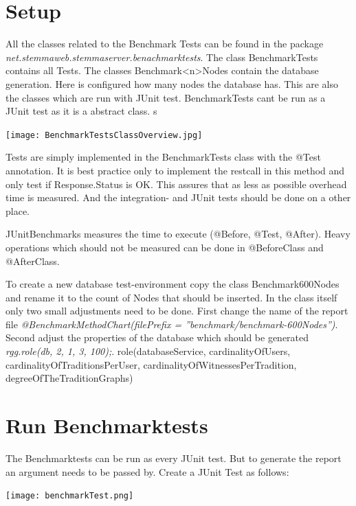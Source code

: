 \documentclass[11pt,fleqn,openany]{book} %
\begin{document}
\section*{Setup}
All the classes related to the Benchmark Tests can be found in the package \\ \textit{net.stemmaweb.stemmaserver.benachmarktests}. The class BenchmarkTests contains all Tests. The classes Benchmark<n>Nodes contain the database generation. Here is configured how many nodes the database has. This are also the classes which are run with JUnit test. BenchmarkTests cant be run as a JUnit test as it is a abstract class. s

\begin{center}
\texttt{[image: BenchmarkTestsClassOverview.jpg]} 
\end{center}

Tests are simply implemented in the BenchmarkTests class with the @Test annotation. It is best practice only to implement the restcall in this method and only test if Response.Status is OK. This assures that as less as possible overhead time is measured. And the integration- and JUnit tests should be done on a other place.

\begin{remark}
JUnitBenchmarks measures the time to execute (@Before, @Test, @After). Heavy operations which should not be measured can be done in @BeforeClass and @AfterClass.
\end{remark}

To create a new database test-environment copy the class Benchmark600Nodes and rename it to the count of Nodes that should be inserted. In the class itself only two small adjustments need to be done. First change the name of the report file \textit{@BenchmarkMethodChart(filePrefix = ''benchmark/benchmark-600Nodes'')}. Second adjust the properties of the database which should be generated \textit{rgg.role(db, 2, 1, 3, 100);}. role(databaseService, cardinalityOfUsers, cardinalityOfTraditionsPerUser, cardinalityOfWitnessesPerTradition, degreeOfTheTraditionGraphs)

\section*{Run Benchmarktests}
The Benchmarktests can be run as every JUnit test. But to generate the report an argument needs to be passed by. 
Create a JUnit Test as follows:

\begin{center}
\texttt{[image: benchmarkTest.png]} 
\end{center}
\end{document}
